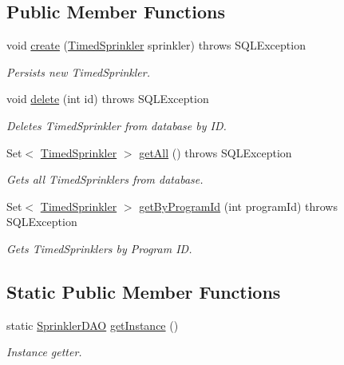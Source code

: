 \subsection*{Public Member Functions}
\begin{DoxyCompactItemize}
\item 
void \hyperlink{classdatabase_1_1SprinklerDAO_aa36660d2b73caa79fa7ad6f85cdf5d73}{create} (\hyperlink{classmodel_1_1TimedSprinkler}{Timed\-Sprinkler} sprinkler)  throws S\-Q\-L\-Exception 
\begin{DoxyCompactList}\small\item\em Persists new Timed\-Sprinkler. \end{DoxyCompactList}\item 
void \hyperlink{classdatabase_1_1SprinklerDAO_a9fa3398276c78b71f4e35a54085515c7}{delete} (int id)  throws S\-Q\-L\-Exception 
\begin{DoxyCompactList}\small\item\em Deletes Timed\-Sprinkler from database by I\-D. \end{DoxyCompactList}\item 
Set$<$ \hyperlink{classmodel_1_1TimedSprinkler}{Timed\-Sprinkler} $>$ \hyperlink{classdatabase_1_1SprinklerDAO_ada482a94d720543499345f7431665875}{get\-All} ()  throws S\-Q\-L\-Exception 
\begin{DoxyCompactList}\small\item\em Gets all Timed\-Sprinklers from database. \end{DoxyCompactList}\item 
Set$<$ \hyperlink{classmodel_1_1TimedSprinkler}{Timed\-Sprinkler} $>$ \hyperlink{classdatabase_1_1SprinklerDAO_a89a1aee06da7613937d4f2b8b482d65f}{get\-By\-Program\-Id} (int program\-Id)  throws S\-Q\-L\-Exception 
\begin{DoxyCompactList}\small\item\em Gets Timed\-Sprinklers by Program I\-D. \end{DoxyCompactList}\end{DoxyCompactItemize}
\subsection*{Static Public Member Functions}
\begin{DoxyCompactItemize}
\item 
static \hyperlink{classdatabase_1_1SprinklerDAO}{Sprinkler\-D\-A\-O} \hyperlink{classdatabase_1_1SprinklerDAO_a1437d73a7864607e52b923af135227d0}{get\-Instance} ()
\begin{DoxyCompactList}\small\item\em Instance getter. \end{DoxyCompactList}\end{DoxyCompactItemize}
